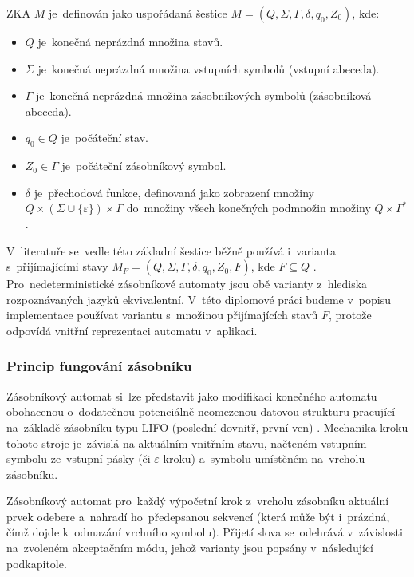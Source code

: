 \documentclass[
  master,
  program=ainfvs,
  printversion,
  figures=false,
  tables=false,
  glossaries,
  index
]{kidiplom}
\begin{document}
\begin{definition}
\gls{ZKA} $M$ je~definován jako uspořádaná šestice $M = (Q, \Sigma, \Gamma, \delta,
q_0, Z_0)$, kde:
\begin{itemize}
    \item $Q$ je~konečná neprázdná množina stavů.
    \item $\Sigma$ je~konečná neprázdná množina vstupních symbolů (vstupní abeceda).
    \item $\Gamma$ je~konečná neprázdná množina zásobníkových symbolů
          (zásobníková abeceda).
    \item $q_0 \in Q$ je~počáteční stav.
    \item $Z_0 \in \Gamma$ je~počáteční zásobníkový symbol.
    \item $\delta$ je~přechodová funkce, definovaná jako zobrazení množiny
          $Q \times (\Sigma \cup \{\varepsilon\}) \times \Gamma$ do~množiny všech
          konečných podmnožin množiny $Q \times \Gamma^*$.
\end{itemize}
\end{definition}

V~literatuře se~vedle této základní šestice běžně používá i~varianta s~přijímajícími stavy
$M_F = (Q, \Sigma, \Gamma, \delta, q_0, Z_0, F)$, kde $F \subseteq Q$
\cite[kapitola~5.2]{jancar_ti}. Pro~nedeterministické zásobníkové automaty jsou obě varianty
z~hlediska rozpoznávaných jazyků ekvivalentní. V~této diplomové práci budeme v~popisu
implementace používat variantu s~množinou přijímajících stavů $F$, protože odpovídá
vnitřní reprezentaci automatu v~aplikaci.

\subsubsection{Princip fungování zásobníku}
Zásobníkový automat si~lze představit jako modifikaci konečného automatu obohacenou
o~dodatečnou potenciálně neomezenou datovou strukturu pracující na~zá\-kla\-dě zásobníku typu LIFO (poslední dovnitř, první ven) \cite[kapitola~4]{jancar_ti}. Mechanika kroku tohoto stroje je~závislá na aktuálním vnitřním stavu, načteném vstupním symbolu ze~vstupní pásky (či $\varepsilon$-kroku) a~symbolu umístěném na~vrcholu zásobníku.

Zásobníkový automat pro~každý výpočetní krok z~vrcholu zásobníku aktuální prvek
odebere a~nahradí ho~předepsanou sekvencí (která může být i~prázdná, čímž dojde
k~odmazání vrchního symbolu). Přijetí slova se~odehrává v~závislosti na~zvoleném
akceptačním módu, jehož varianty jsou popsány v~následující podkapitole.
\end{document}
